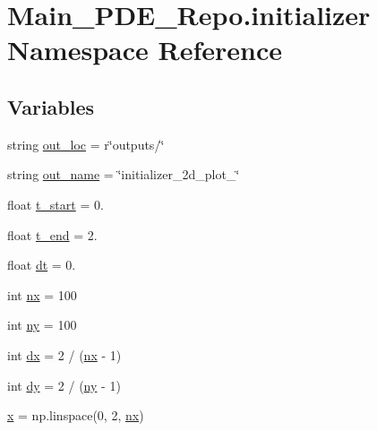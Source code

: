 \hypertarget{namespaceMain__PDE__Repo_1_1initializer}{}\section{Main\+\_\+\+P\+D\+E\+\_\+\+Repo.\+initializer Namespace Reference}
\label{namespaceMain__PDE__Repo_1_1initializer}
\subsection*{Variables}
\begin{DoxyCompactItemize}
\item 
string \hyperlink{namespaceMain__PDE__Repo_1_1initializer_acf6a435968a90051222f233d914c5397}{out\+\_\+loc} = r\char`\"{}outputs/\char`\"{}
\item 
string \hyperlink{namespaceMain__PDE__Repo_1_1initializer_a46b587e3a760d2bc366f1b38609c5af9}{out\+\_\+name} = \char`\"{}initializer\+\_\+2d\+\_\+plot\+\_\char`\"{}
\item 
float \hyperlink{namespaceMain__PDE__Repo_1_1initializer_a8f26c89cc507005999c925cc575638cf}{t\+\_\+start} = 0.
\item 
float \hyperlink{namespaceMain__PDE__Repo_1_1initializer_ab123ebb4c5c95ab09b8d8310af223730}{t\+\_\+end} = 2.
\item 
float \hyperlink{namespaceMain__PDE__Repo_1_1initializer_ab8ea6f49ea65c76cfaa727f10e349ec5}{dt} = 0.
\item 
int \hyperlink{namespaceMain__PDE__Repo_1_1initializer_a7b9a1175cb86388f7315a7c6dee797e3}{nx} = 100
\item 
int \hyperlink{namespaceMain__PDE__Repo_1_1initializer_a705f203425c609ebc41db74879bf413a}{ny} = 100
\item 
int \hyperlink{namespaceMain__PDE__Repo_1_1initializer_ab7752e585cb1e9951e583722826dc47b}{dx} = 2 / (\hyperlink{namespaceMain__PDE__Repo_1_1initializer_a7b9a1175cb86388f7315a7c6dee797e3}{nx} -\/ 1)
\item 
int \hyperlink{namespaceMain__PDE__Repo_1_1initializer_aa755829a50d6b513279ec4ac18abd4ba}{dy} = 2 / (\hyperlink{namespaceMain__PDE__Repo_1_1initializer_a705f203425c609ebc41db74879bf413a}{ny} -\/ 1)
\item 
\hyperlink{namespaceMain__PDE__Repo_1_1initializer_a495f211daae2ee5ae3bbdb86436c35b5}{x} = np.\+linspace(0, 2, \hyperlink{namespaceMain__PDE__Repo_1_1initializer_a7b9a1175cb86388f7315a7c6dee797e3}{nx})
\item 

\end{DoxyCompactItemize}
